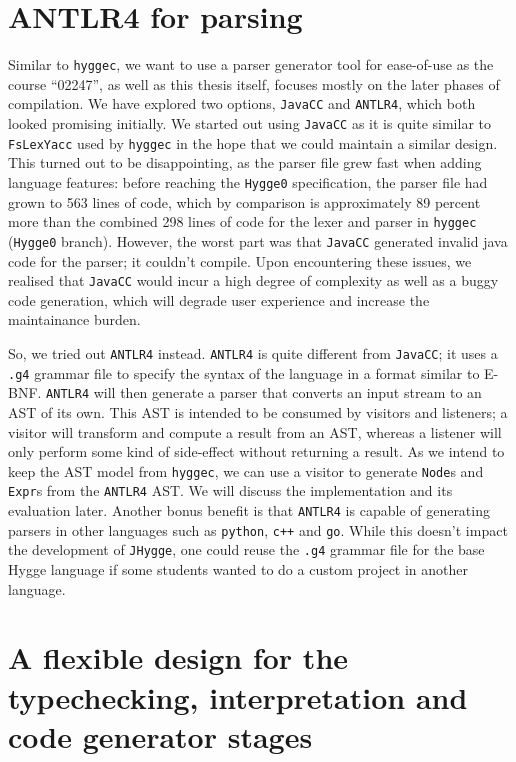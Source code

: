 \section{ANTLR4 for parsing}

Similar to \texttt{hyggec}, we want to use a parser generator tool for ease-of-use as the course ``02247'', as well as this
thesis itself, focuses mostly on the later phases of compilation. We have explored two options, \texttt{JavaCC} and \texttt{ANTLR4},
which both looked promising initially. We started out using \texttt{JavaCC} as it is quite similar to \texttt{FsLexYacc} used by
\texttt{hyggec} in the hope that we could maintain a similar design. This turned out to be disappointing, as the parser file
grew fast when adding language features: before reaching the \texttt{Hygge0} specification, the parser file had grown to 563
lines of code, which by comparison is approximately 89 percent more than the combined 298 lines of code for the lexer and
parser in \texttt{hyggec} (\texttt{Hygge0} branch). However, the worst part was that \texttt{JavaCC} generated invalid java
code for the parser; it couldn't compile. Upon encountering these issues, we realised that \texttt{JavaCC} would incur a
high degree of complexity as well as a buggy code generation, which will degrade user experience and increase the maintainance
burden.

So, we tried out \texttt{ANTLR4} instead. \texttt{ANTLR4} is quite different from \texttt{JavaCC}; it uses a \texttt{.g4} grammar
file to specify the syntax of the language in a format similar to E-BNF. \texttt{ANTLR4} will then generate a parser that converts
an input stream to an AST of its own. This AST is intended to be consumed by visitors and listeners; a visitor will transform and
compute a result from an AST, whereas a listener will only perform some kind of side-effect without returning a result. As we
intend to keep the AST model from \texttt{hyggec}, we can use a visitor to generate \texttt{Node}s and \texttt{Expr}s from the
\texttt{ANTLR4} AST. We will discuss the implementation and its evaluation later. Another bonus benefit is that \texttt{ANTLR4}
is capable of generating parsers in other languages such as \texttt{python}, \texttt{c++} and \texttt{go}. While this doesn't
impact the development of \texttt{JHygge}, one could reuse the \texttt{.g4} grammar file for the base Hygge language if some
students wanted to do a custom project in another language.

\section{A flexible design for the typechecking, interpretation and code generator stages}

